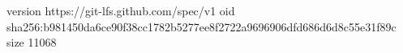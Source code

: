 version https://git-lfs.github.com/spec/v1
oid sha256:b981450da6ce90f38cc1782b5277ee8f2722a9696906dfd686d6d8c55e31f89c
size 11068
